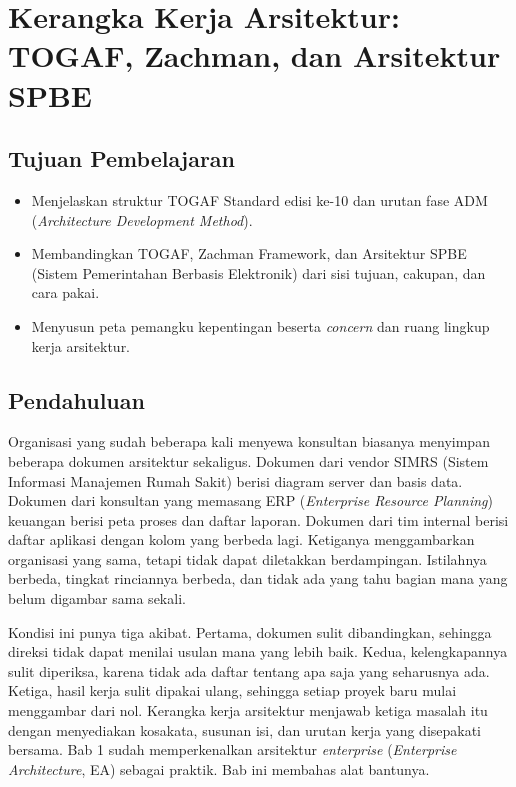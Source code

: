 \chapter{Kerangka Kerja Arsitektur: TOGAF, Zachman, dan Arsitektur SPBE}

\section*{Tujuan Pembelajaran}
\begin{itemize}
  \item Menjelaskan struktur TOGAF Standard edisi ke-10 dan urutan fase ADM (\textit{Architecture Development Method}).
  \item Membandingkan TOGAF, Zachman Framework, dan Arsitektur SPBE (Sistem Pemerintahan Berbasis Elektronik) dari sisi tujuan, cakupan, dan cara pakai.
  \item Menyusun peta pemangku kepentingan beserta \textit{concern} dan ruang lingkup kerja arsitektur.
\end{itemize}

\section{Pendahuluan}

Organisasi yang sudah beberapa kali menyewa konsultan biasanya menyimpan
beberapa dokumen arsitektur sekaligus. Dokumen dari vendor SIMRS (Sistem
Informasi Manajemen Rumah Sakit) berisi diagram server dan basis data.
Dokumen dari konsultan yang memasang ERP (\textit{Enterprise Resource
Planning}) keuangan berisi peta proses dan daftar laporan. Dokumen dari tim
internal berisi daftar aplikasi dengan kolom yang berbeda lagi. Ketiganya
menggambarkan organisasi yang sama, tetapi tidak dapat diletakkan
berdampingan. Istilahnya berbeda, tingkat rinciannya berbeda, dan tidak ada
yang tahu bagian mana yang belum digambar sama sekali.

Kondisi ini punya tiga akibat. Pertama, dokumen sulit dibandingkan, sehingga
direksi tidak dapat menilai usulan mana yang lebih baik. Kedua,
kelengkapannya sulit diperiksa, karena tidak ada daftar tentang apa saja
yang seharusnya ada. Ketiga, hasil kerja sulit dipakai ulang, sehingga setiap
proyek baru mulai menggambar dari nol. Kerangka kerja arsitektur menjawab
ketiga masalah itu dengan menyediakan kosakata, susunan isi, dan urutan kerja
yang disepakati bersama. Bab 1 sudah memperkenalkan arsitektur
\textit{enterprise} (\textit{Enterprise Architecture}, EA) sebagai praktik.
Bab ini membahas alat bantunya.

